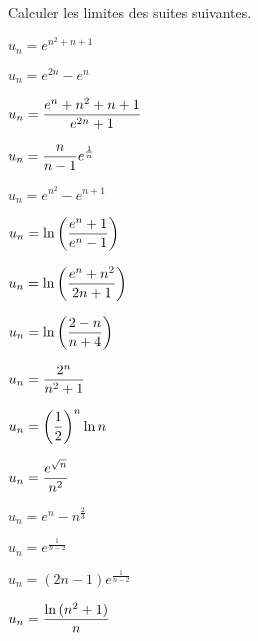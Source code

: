 \documentclass[a4paper, 11pt]{article}
\begin{document}
\begin{exercice}  \;
Calculer les limites des suites suivantes. 
\begin{enumerate}
\noindent \begin{minipage}[t]{0.3\textwidth}
\item $u_n=e^{n^2+n+1}$
\item $u_n=e^{2n}-e^n$
\item $u_n=\displaystyle\frac{e^n+n^2+n+1}{e^{2n}+1}$
\item $u_n=\displaystyle\frac{n}{n-1}e^{\frac{1}{n}}$
\item $u_n=e^{n^2}-e^{n+1}$
\item $u_n=\ln{\left(\displaystyle\frac{e^n+1}{e^n-1}\right)}$
\end{minipage}
\begin{minipage}[t]{0.3\textwidth}

\item $u_n=\ln{\left(\displaystyle\frac{e^n+n^2}{2n+1}\right)}$
\item $u_n=\ln{\left(\displaystyle\frac{2-n}{n+4}\right)}$
\item $u_n=\displaystyle\frac{2^n}{n^2+1}$
\item $u_n=\left( \displaystyle\frac{1}{2} \right)^n \ln{n}$
\end{minipage}
\begin{minipage}[t]{0.3\textwidth}
\item $u_n=\displaystyle\frac{e^{\sqrt{n}}}{n^2}$
\item $u_n=e^n-n^{\frac{2}{3}}$
\item $u_n=e^{\frac{1}{n-2}}$
\item $u_n=(2n-1)e^{\frac{1}{n-2}}$
\item $u_n=\displaystyle\frac{\ln{(n^2+1)}}{n}$
\end{minipage}
\end{enumerate}
\end{exercice}
\end{document}
